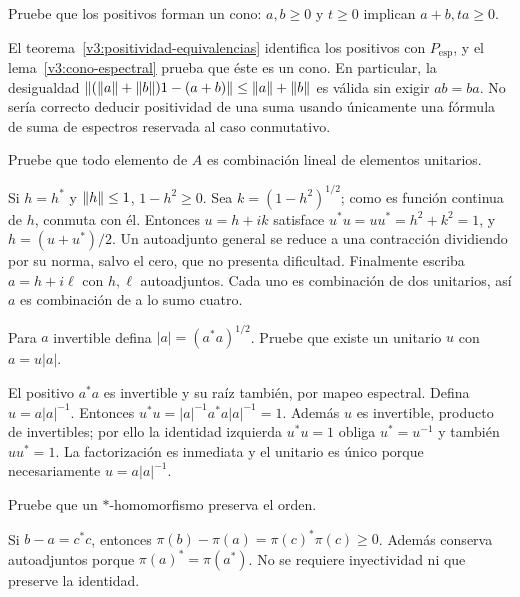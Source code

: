 \begin{ejercicio}\label{ej:v3-l27-4}
Pruebe que los positivos forman un cono: $a,b\ge0$ y $t\ge0$ implican $a+b,ta\ge0$.
\end{ejercicio}
\begin{solucion}
El teorema~\ref{v3:positividad-equivalencias} identifica los positivos con $P_{\mathrm{esp}}$, y el lema~\ref{v3:cono-espectral} prueba que éste es un cono. En particular, la desigualdad
$\left\lVert(\left\lVert a\right\rVert+\left\lVert b\right\rVert)1-(a+b)\right\rVert\le\left\lVert a\right\rVert+\left\lVert b\right\rVert$
es válida sin exigir $ab=ba$. No sería correcto deducir positividad de una suma usando únicamente una fórmula de suma de espectros reservada al caso conmutativo.
\end{solucion}

\begin{ejercicio}\label{ej:v3-l27-5}
Pruebe que todo elemento de $A$ es combinación lineal de elementos unitarios.
\end{ejercicio}
\begin{solucion}
Si $h=h^*$ y $\left\lVert h\right\rVert\le1$, $1-h^2\ge0$. Sea $k=(1-h^2)^{1/2}$; como es función continua de $h$, conmuta con él. Entonces $u=h+ik$ satisface $u^*u=uu^*=h^2+k^2=1$, y $h=(u+u^*)/2$. Un autoadjunto general se reduce a una contracción dividiendo por su norma, salvo el cero, que no presenta dificultad. Finalmente escriba $a=h+i\ell$ con $h,\ell$ autoadjuntos. Cada uno es combinación de dos unitarios, así $a$ es combinación de a lo sumo cuatro.
\end{solucion}

\begin{ejercicio}\label{ej:v3-l27-6}
Para $a$ invertible defina $|a|=(a^*a)^{1/2}$. Pruebe que existe un unitario $u$ con $a=u|a|$.
\end{ejercicio}
\begin{solucion}
El positivo $a^*a$ es invertible y su raíz también, por mapeo espectral. Defina $u=a|a|^{-1}$. Entonces $u^*u=|a|^{-1}a^*a|a|^{-1}=1$. Además $u$ es invertible, producto de invertibles; por ello la identidad izquierda $u^*u=1$ obliga $u^*=u^{-1}$ y también $uu^*=1$. La factorización es inmediata y el unitario es único porque necesariamente $u=a|a|^{-1}$.
\end{solucion}

\begin{ejercicio}\label{ej:v3-l27-7}
Pruebe que un $*$-homomorfismo preserva el orden.
\end{ejercicio}
\begin{solucion}
Si $b-a=c^*c$, entonces $\pi(b)-\pi(a)=\pi(c)^*\pi(c)\ge0$. Además conserva autoadjuntos porque $\pi(a)^*=\pi(a^*)$. No se requiere inyectividad ni que preserve la identidad.
\end{solucion}

